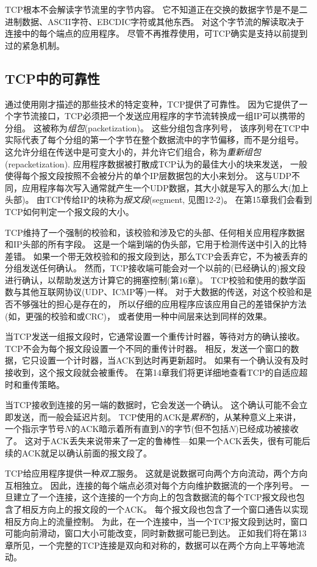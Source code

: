 \documentclass{../main.tex}{subfiles}
\begin{document}
TCP根本不会解读字节流里的字节内容。
它不知道正在交换的数据字节是不是二进制数据、ASCII字符、EBCDIC字符或其他东西。
对这个字节流的解读取决于连接中的每个端点的应用程序。
尽管不再推荐使用，可TCP确实是支持以前提到过的紧急机制。

\subsection{TCP中的可靠性}
通过使用刚才描述的那些技术的特定变种，TCP提供了可靠性。
因为它提供了一个字节流接口，TCP必须把一个发送应用程序的字节流转换成一组IP可以携带的分组。
这被称为\emph{组包}(packetization)。
这些分组包含序列号，
该序列号在TCP中实际代表了每个分组的第一个字节在整个数据流中的字节偏移，而不是分组号。
这允许分组在传送中是可变大小的，并允许它们组合，称为\emph{重新组包}(repacketization).
应用程序数据被打散成TCP认为的最佳大小的块来发送，
一般使得每个报文段按照不会被分片的单个IP层数据包的大小来划分。
这与UDP不同，应用程序每次写入通常就产生一个UDP数据，其大小就是写入的那么大(加上头部)。
由TCP传给IP的块称为\emph{报文段}(segment, 见图12-2)。
在第15章我们会看到TCP如何判定一个报文段的大小。

TCP维持了一个强制的校验和，该校验和涉及它的头部、任何相关应用程序数据和IP头部的所有字段。
这是一个端到端的伪头部，它用于检测传送中引入的比特差错。
如果一个带无效校验和的报文段到达，那么TCP会丢弃它，不为被丢弃的分组发送任何确认。
然而，TCP接收端可能会对一个以前的(已经确认的)报文段进行确认，以帮助发送方计算它的拥塞控制(第16章)。
TCP校验和使用的数学函数与其他互联网协议(UDP、ICMP等)一样。
对于大数据的传送，对这个校验和是否不够强壮的担心是存在的，
所以仔细的应用程序应该应用自己的差错保护方法(如，更强的校验和或CRC)，
或者使用一种中间层来达到同样的效果。

当TCP发送一组报文段时，它通常设置一个重传计时器，等待对方的确认接收。
TCP不会为每个报文段设置一个不同的重传计时器。
相反，发送一个窗口的数据，它只设置一个计时器，当ACK到达时再更新超时。
如果有一个确认没有及时接收到，这个报文段就会被重传。
在第14章我们将更详细地查看TCP的自适应超时和重传策略。

当TCP接收到连接的另一端的数据时，它会发送一个确认。
这个确认可能不会立即发送，而一般会延迟片刻。
TCP使用的ACK是\emph{累积}的，从某种意义上来讲，
一个指示字节号$N$的ACK暗示着所有直到$N$的字节(但不包括$N$)已经成功被接收了。
这对于ACK丢失来说带来了一定的鲁棒性---如果一个ACK丢失，很有可能后续的ACK就足以确认前面的报文段了。

TCP给应用程序提供一种\emph{双工}服务。
这就是说数据可向两个方向流动，两个方向互相独立。
因此，连接的每个端点必须对每个方向维护数据流的一个序列号。
一旦建立了一个连接，这个连接的一个方向上的包含数据流的每个TCP报文段也包含了相反方向上的报文段的一个ACK。
每个报文段也包含了一个窗口通告以实现相反方向上的流量控制。
为此，在一个连接中，当一个TCP报文段到达时，窗口可能向前滑动，窗口大小可能改变，同时新数据可能已到达。
正如我们将在第13章所见，一个完整的TCP连接是双向和对称的，数据可以在两个方向上平等地流动。
\end{document}
